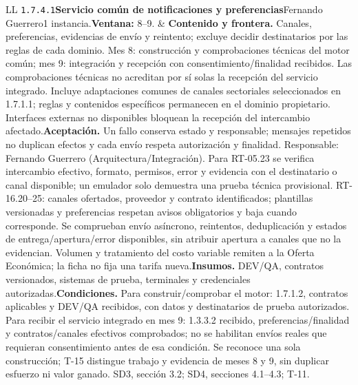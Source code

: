 \begin{longtable}{L{\tabcolsep\relax}L{\tabcolsep\relax}}
\texttt{1.\allowbreak{}7.\allowbreak{}4.\allowbreak{}1}\newline{}\textbf{Servicio común de notificaciones y preferencias}\newline{}Fernando Guerrero\newline{}1 instancia.\newline{}\textbf{Ventana:} 8--9. & \textbf{Contenido y frontera.} Canales, preferencias, evidencias de envío y reintento; excluye decidir destinatarios por las reglas de cada dominio. Mes 8: construcción y comprobaciones técnicas del motor común; mes 9: integración y recepción con consentimiento/finalidad recibidos. Las comprobaciones técnicas no acreditan por sí solas la recepción del servicio integrado. Incluye adaptaciones comunes de canales sectoriales seleccionados en 1.7.1.1; reglas y contenidos específicos permanecen en el dominio propietario. Interfaces externas no disponibles bloquean la recepción del intercambio afectado.\newline{}\textbf{Aceptación.} Un fallo conserva estado y responsable; mensajes repetidos no duplican efectos y cada envío respeta autorización y finalidad. Responsable: Fernando Guerrero (Arquitectura/Integración). Para RT-05.23 se verifica intercambio efectivo, formato, permisos, error y evidencia con el destinatario o canal disponible; un emulador solo demuestra una prueba técnica provisional. RT-16.20--25: canales ofertados, proveedor y contrato identificados; plantillas versionadas y preferencias respetan avisos obligatorios y baja cuando corresponde. Se comprueban envío asíncrono, reintentos, deduplicación y estados de entrega/apertura/error disponibles, sin atribuir apertura a canales que no la evidencian. Volumen y tratamiento del costo variable remiten a la Oferta Económica; la ficha no fija una tarifa nueva.\newline{}\textbf{Insumos.} DEV/QA, contratos versionados, sistemas de prueba, terminales y credenciales autorizadas.\newline{}\textbf{Condiciones.} Para construir/comprobar el motor: 1.7.1.2, contratos aplicables y DEV/QA recibidos, con datos y destinatarios de prueba autorizados. Para recibir el servicio integrado en mes 9: 1.3.3.2 recibido, preferencias/finalidad y contratos/canales efectivos comprobados; no se habilitan envíos reales que requieran consentimiento antes de esa condición. Se reconoce una sola construcción; T-15 distingue trabajo y evidencia de meses 8 y 9, sin duplicar esfuerzo ni valor ganado. SD3, sección 3.2; SD4, secciones 4.1--4.3; T-11.\\\hline

\end{longtable}
